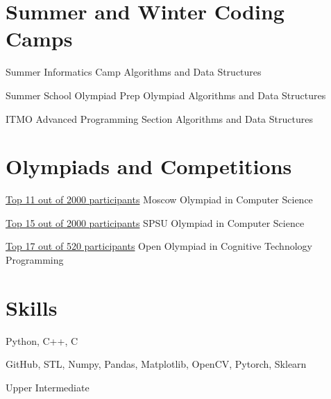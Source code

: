 \documentclass[12pt,a4paper]{moderncv}
\begin{document}
    \section{Summer and Winter Coding Camps}
        
         {Summer Informatics Camp} {}{} {Algorithms and Data Structures} {}
        
         {Summer School Olympiad Prep} {}{} {Olympiad Algorithms and Data Structures} {}
        
         {ITMO Advanced Programming Section} {}{} {Algorithms and Data Structures} {}
    
    \section{Olympiads and Competitions}
        
         {\href {http://mos-inf.olimpiada.ru/winners10-11-2019} {Top 11 out of 2000 participants}}
            {Moscow Olympiad in Computer Science} {} {} {}
        
         {\href {https://diploma.rsr-olymp.ru/files/rsosh-diplomas-static/compiled-storage-2019/by-code/141299110240/color.pdf} {Top 15 out of 2000 participants}}
            {SPSU Olympiad in Computer Science} {} {} {}
            
         {\href {https://diploma.rsr-olymp.ru/files/rsosh-diplomas-static/compiled-storage-2019/by-code/142158979050/color.pdf} {Top 17 out of 520 participants}}
            {Open Olympiad in Cognitive Technology Programming} {} {} {}
    
    \section{Skills}
    
         {Python, C++, C}
        
         {GitHub, STL, Numpy, Pandas, Matplotlib, OpenCV, Pytorch, Sklearn}
    
         {Upper Intermediate}
        
\end{document}
